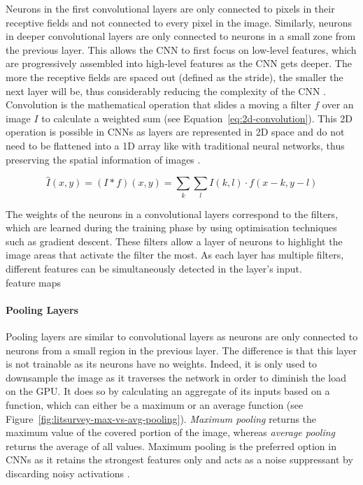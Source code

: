 Neurons in the first convolutional layers are only connected to pixels in their receptive fields and not connected to every pixel in the image. Similarly, neurons in deeper convolutional layers are only connected to neurons in a small zone from the previous layer. This allows the CNN to first focus on low-level features, which are progressively assembled into high-level features as the CNN gets deeper. The more the receptive fields are spaced out (defined as the stride), the smaller the next layer will be, thus considerably reducing the complexity of the CNN \citep{Geron2019}. Convolution is the mathematical operation that slides a moving a filter $f$ over an image $I$ to calculate a weighted sum (see Equation~\ref{eq:2d-convolution}). This 2D operation is possible in CNNs as layers are represented in 2D space and do not need to be flattened into a 1D array like with traditional neural networks, thus preserving the spatial information of images \citep{szeliski2010computer}.

\begin{equation}
\label{eq:2d-convolution}
    \hat{I}(x,y)=(I*f)(x,y)=\sum_{k}\sum_{l}I(k,l)\cdot f(x-k, y-l)
\end{equation}

The weights of the neurons in a convolutional layers correspond to the filters, which are learned during the training phase by using optimisation techniques such as gradient descent. These filters allow a layer of neurons to highlight the image areas that activate the filter the most. As each layer has multiple filters, different features can be simultaneously detected in the layer's input.\\

feature maps

\paragraph{Pooling Layers}

Pooling layers are similar to convolutional layers as neurons are only connected to neurons from a small region in the previous layer. The difference is that this layer is not trainable as its neurons have no weights. Indeed, it is only used to downsample the image as it traverses the network in order to diminish the load on the GPU. It does so by calculating an aggregate of its inputs based on a function, which can either be a maximum or an average function (see Figure~\ref{fig:litsurvey-max-vs-avg-pooling}). \textit{Maximum pooling} returns the maximum value of the covered portion of the image, whereas \textit{average pooling} returns the average of all values. Maximum pooling is the preferred option in CNNs as it retains the strongest features only and acts as a noise suppressant by discarding noisy activations \citep{Geron2019}.\\

